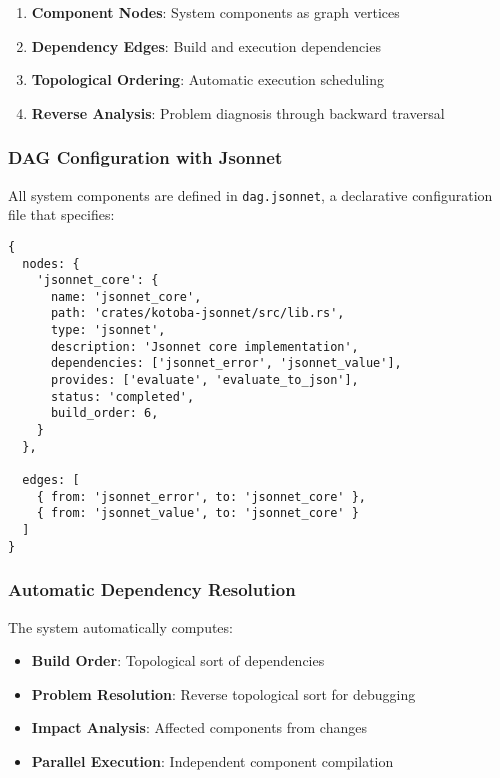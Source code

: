 \documentclass[11pt,a4paper]{article}
\begin{document}
\begin{enumerate}
\item \textbf{Component Nodes}: System components as graph vertices
\item \textbf{Dependency Edges}: Build and execution dependencies
\item \textbf{Topological Ordering}: Automatic execution scheduling
\item \textbf{Reverse Analysis}: Problem diagnosis through backward traversal
\end{enumerate}

\subsubsection{DAG Configuration with Jsonnet}
\label{subsubsec:dag_config}

All system components are defined in \texttt{dag.jsonnet}, a declarative configuration file that specifies:

\begin{lstlisting}[language=jsonnet,caption=Example dag.jsonnet configuration]
{
  nodes: {
    'jsonnet_core': {
      name: 'jsonnet_core',
      path: 'crates/kotoba-jsonnet/src/lib.rs',
      type: 'jsonnet',
      description: 'Jsonnet core implementation',
      dependencies: ['jsonnet_error', 'jsonnet_value'],
      provides: ['evaluate', 'evaluate_to_json'],
      status: 'completed',
      build_order: 6,
    }
  },

  edges: [
    { from: 'jsonnet_error', to: 'jsonnet_core' },
    { from: 'jsonnet_value', to: 'jsonnet_core' }
  ]
}
\end{lstlisting}

\subsubsection{Automatic Dependency Resolution}
\label{subsubsec:dependency_resolution}

The system automatically computes:
\begin{itemize}
\item \textbf{Build Order}: Topological sort of dependencies
\item \textbf{Problem Resolution}: Reverse topological sort for debugging
\item \textbf{Impact Analysis}: Affected components from changes
\item \textbf{Parallel Execution}: Independent component compilation
\end{itemize}
\end{document}
